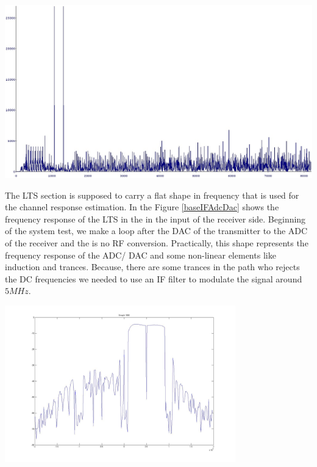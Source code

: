 \begin{center}
\includegraphics[width=\textwidth]{content/fig/crosscorr.JPG}
\label{crosscorr}
\end{center}

The LTS section is supposed to carry a flat shape in frequency that is used for the channel response estimation. In the Figure \ref{baseIFAdcDac} shows the frequency response of the LTS in the in the input of the receiver side. Beginning of the system test, we make a loop after the DAC of the transmitter to the ADC of the receiver and the is no RF conversion. Practically, this shape represents the frequency response of the ADC/ DAC and some non-linear elements like induction and trances. Because, there are some trances in the path who rejects the DC frequencies we needed to use an IF filter to modulate the signal around $5 MHz$.\\

\begin{center}
\includegraphics[width=10cm]{content/fig/baseIFAdcDac.JPG}
\label{baseIFAdcDac}
\end{center}

